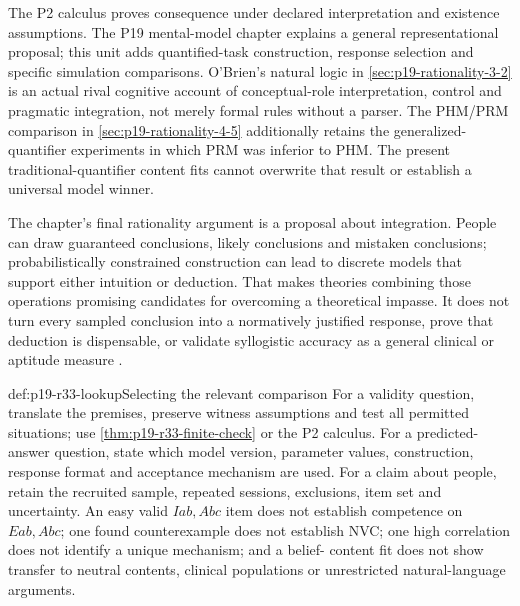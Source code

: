 The P2 calculus proves consequence under declared interpretation and
existence assumptions. The P19 mental-model chapter explains a general
representational proposal; this unit adds quantified-task construction,
response selection and specific simulation comparisons. O'Brien's natural
logic in \cref{sec:p19-rationality-3-2} is an actual rival cognitive
account of conceptual-role interpretation, control and pragmatic
integration, not merely formal rules without a parser.
The PHM/PRM comparison in \cref{sec:p19-rationality-4-5} additionally
retains the generalized-quantifier experiments in which PRM was inferior
to PHM. The present traditional-quantifier content fits cannot overwrite
that result or establish a universal model winner.

The chapter's final rationality argument is a proposal about integration.
People can draw guaranteed conclusions, likely conclusions and mistaken
conclusions; probabilistically constrained construction can lead to
discrete models that support either intuition or deduction. That makes
theories combining those operations promising candidates for overcoming
a theoretical impasse. It does not turn every sampled conclusion into a
normatively justified response, prove that deduction is dispensable,
or validate syllogistic accuracy as a general clinical or aptitude measure
\cite[pp.~233--234]{Khemlani2021Syllogistic}.

\begin{hbconvention}{def:p19-r33-lookup}{Selecting the relevant comparison}
For a validity question, translate the premises, preserve witness assumptions
and test all permitted situations; use \cref{thm:p19-r33-finite-check}
or the P2 calculus. For a predicted-answer question, state which model
version, parameter values, construction, response format and acceptance
mechanism are used. For a claim about people, retain the recruited sample,
repeated sessions, exclusions, item set and uncertainty.
An easy valid \(Iab,Abc\) item does not establish competence on
\(Eab,Abc\); one found counterexample does not establish NVC;
one high correlation does not identify a unique mechanism; and a belief-
content fit does not show transfer to neutral contents, clinical populations
or unrestricted natural-language arguments.
\end{hbconvention}
